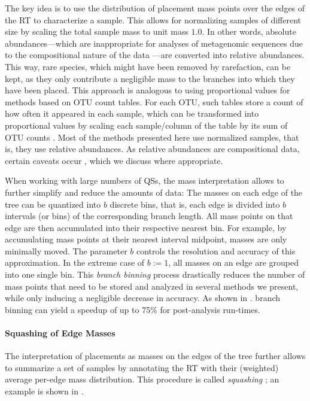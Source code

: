 The key idea is to use the distribution of placement mass points over the edges of the \ac{RT} to characterize a sample.
This allows for normalizing samples of different size
by scaling the total sample mass to unit mass $1.0$.
In other words, absolute abundances---which are inappropriate for analyses
of metagenomic sequences due to the compositional nature of the data \cite{Gloor2017}---are converted into relative abundances.
This way, rare species, which might have been removed by rarefaction, can be kept,
as they only contribute a negligible mass to the branches into which they have been placed.
This approach is analogous to using proportional values for methods based on OTU count tables.
For each OTU, such tables store a count of how often it appeared in each sample,
which can be transformed into proportional values
by scaling each sample/column of the table by its sum of OTU counts \cite{Weiss2017}.
Most of the methods presented here use normalized samples, that is, they use relative abundances.
As relative abundances are compositional data, certain caveats occur \cite{Aitchison1986,Lovell2015,Gloor2016},
which we discuss where appropriate.

When working with large numbers of \acp{QS},
the mass interpretation allows to further simplify and reduce the amounts of data:
The masses on each edge of the tree can be quantized into $b$ discrete bins,
that is, each edge is divided into $b$ intervals (or bins) of the corresponding branch length.
All mass points on that edge are then accumulated into their respective nearest bin.
For example, by accumulating mass points at their nearest interval midpoint, masses are only minimally moved.
The parameter $b$ controls the resolution and accuracy of this approximation.
In the extreme case of $b:=1$, all masses on an edge are grouped into one single bin.
This \emph{branch binning} process drastically reduces the number of mass points
that need to be stored and analyzed in several methods we present,
while only inducing a negligible decrease in accuracy.
As shown in .
branch binning can yield a speedup of up to 75\% for post-analysis run-times.

\paragraph{Squashing of Edge Masses}
\label{ch:Foundations:sec:PhylogeneticPlacement:sub:PlacementProcessing:par:Squashing}

The interpretation of placements as masses on the edges of the tree further allows to summarize a set of samples
by annotating the \ac{RT} with their (weighted) average per-edge mass distribution.
This procedure is called \emph{squashing} \cite{Matsen2011a};
an example is shown in .

